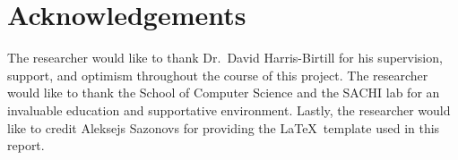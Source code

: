 


\chapter{Acknowledgements}

\label{chapter:acknowledgements}

The researcher would like to thank Dr.\ David Harris-Birtill for his supervision, support, and optimism throughout the course of this project. The researcher would like to thank the School of Computer Science and the SACHI lab for an invaluable education and supportative environment. Lastly, the researcher would like to credit Aleksejs Sazonovs for providing the \LaTeX \, template used in this report.


